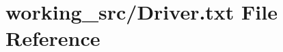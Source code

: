 \hypertarget{_driver_8txt}{}\section{working\+\_\+src/\+Driver.txt File Reference}
\label{_driver_8txt}
